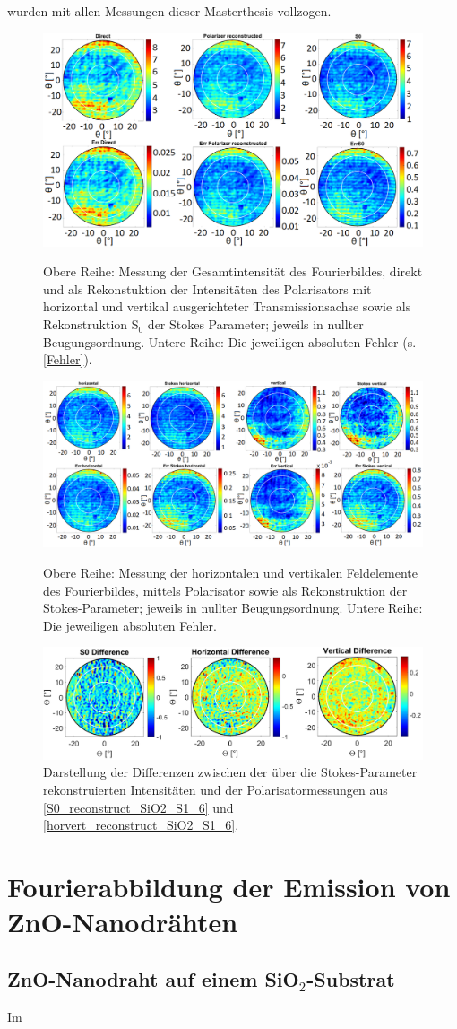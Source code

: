wurden mit allen Messungen dieser Masterthesis vollzogen. \begin{figure}[h]
\centering
\includegraphics[width=.75\textwidth]{Bilder/Methodik/S0_reconstruct_SiO2_S1_6}
\caption{Obere Reihe: Messung der Gesamtintensität des Fourierbildes, direkt und
als Rekonstuktion der Intensitäten des Polarisators mit horizontal und vertikal
ausgerichteter Transmissionsachse sowie als Rekonstruktion S$_0$ der Stokes
Parameter; jeweils in nullter Beugungsordnung. Untere Reihe: Die jeweiligen
absoluten Fehler (s. \autoref{Fehler}).} \label{S0_reconstruct_SiO2_S1_6}
\includegraphics[width=1\textwidth]{Bilder/Methodik/horvert_reconstruct_SiO2_S1_6}
\caption{Obere Reihe: Messung der horizontalen und vertikalen Feldelemente des
Fourierbildes, mittels Polarisator sowie als Rekonstruktion der
Stokes-Parameter; jeweils in nullter Beugungsordnung. Untere Reihe: Die
jeweiligen absoluten Fehler.} \label{horvert_reconstruct_SiO2_S1_6} \centering
\includegraphics[width=.75\textwidth]{Bilder/Methodik/Diff_reconstruct_SiO2_S1_6}
\caption{Darstellung der Differenzen zwischen der über die Stokes-Parameter
rekonstruierten Intensitäten und der Polarisatormessungen aus
\autoref{S0_reconstruct_SiO2_S1_6} und \autoref{horvert_reconstruct_SiO2_S1_6}.}
\label{Diff_SiO2_S1_6} \end{figure} \chapter{Fourierabbildung der Emission von
ZnO-Nanodrähten} \section{ZnO-Nanodraht auf einem SiO$_\text{2}$-Substrat} Im
